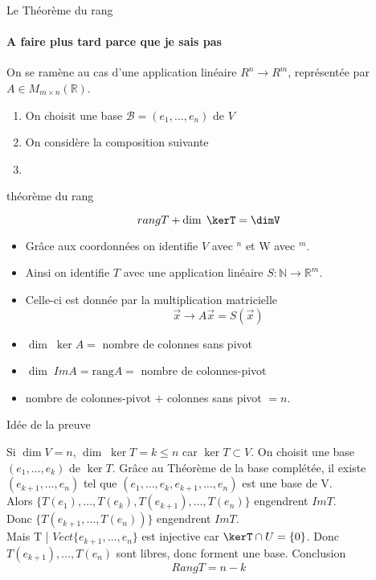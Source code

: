 \begin{parag}{Le Théorème du rang}
    



\paragraph{A faire plus tard parce que je sais pas}
    On se ramène au cas d'une application linéaire $R^n \to R^m$, représentée par $A \in M_{m\times n}\left(\mathbb{R} \right)$.
    \begin{enumerate}
        \item On choisit une base $\mathcal{B} = \left(e_1, \dots, e_n\right)$ de $V$
        \item On considère la composition suivante
 \item     \end{enumerate}


\begin{theoreme}{théorème du rang}
    
        \[rangT + \dim\; \kerT  = \dimV\]
    
\end{theoreme}
\begin{itemize}
    \item Grâce aux coordonnées on identifie $V$ avec \R$^n$ et W avec \R$^m$.
    \item Ainsi on identifie $T$ avec une application linéaire $S: \mathbb{N} \to \mathbb{R}^m$.
    \item Celle-ci est donnée par la multiplication matricielle \[\vec{x} \to A\vec{x} = S\left(\vec{x}\right)\]
    \item $\dim \; \ker A = $ nombre de colonnes sans pivot
    \item $\dim \; ImA = \text{rang}A = $ nombre de colonnes-pivot
    \item  nombre de colonnes-pivot $+$ colonnes sans pivot $= n$.
\end{itemize}

\begin{subparag}{Idée de la preuve}
    

Si $\dim V = n$, $\dim \; \ker T = k \leq n$ car $\ker T \subset V$. On choisit une base $\left(e_1, \dots, e_k\right)$ de $\ker T$. Grâce au Théorème de la base complétée, il existe $\left(e_{k+1}, \dots, e_n\right)$  tel que $\left(e_1, \dots, e_k, e_{k+1}, \dots, e_n\right) $ est une base de V. 
\\
Alors $\{T\left(e_1\right), \dots, T\left(e_k\right), T\left(e_{k+1}\right), \dots, T\left(e_n\right)\}$ engendrent $ImT$.
\\
Donc $\{T\left(e_{k+1}, \dots, T\left(e_n\right)\right)\}$ engendrent $ImT$.
\\
Mais T | $Vect\{e_{k+1}, \dots, e_n\}$ est injective car $\kerT \cap U = \{0\}$.
Donc $T\left(e_{k+1}\right), \dots, T\left(e_n\right)$ sont libres, donc forment une base. Conclusion \[RangT  = n - k\]
\end{subparag}



\end{parag}
